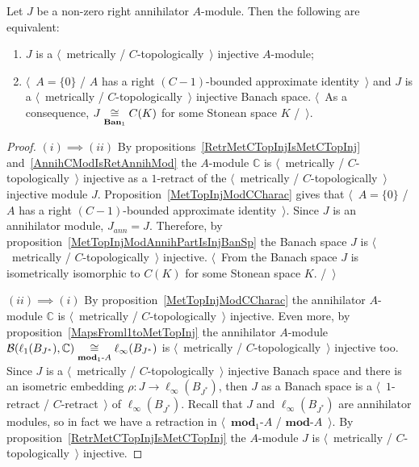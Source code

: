 \begin{proposition}\label{MetTopInjOfAnnihModCharac} Let $J$ be a non-zero right
annihilator $A$-module. Then the following are equivalent:

\begin{enumerate}[label = (\roman*)]
    \item $J$ is a $\langle$~metrically / $C$-topologically~$\rangle$ injective
    $A$-module;

    \item $\langle$~$A= \{0 \}$ / $A$ has a right $(C-1)$-bounded approximate
    identity~$\rangle$ and $J$ is a $\langle$~metrically /
    $C$-topologically~$\rangle$ injective Banach space. $\langle$~As a
    consequence, $J\mathrel{\mathop{\cong}\limits_{\mathbf{Ban}_1}}C(K)$ for some Stonean space $K$
    /~$\rangle$.
\end{enumerate}
\end{proposition}
\begin{proof} $(i)\implies (ii)$ By 
propositions~\ref{RetrMetCTopInjIsMetCTopInj} and~\ref{AnnihCModIsRetAnnihMod} 
the $A$-module $\mathbb{C}$ is
$\langle$~metrically / $C$-topologically~$\rangle$ injective as a $1$-retract of the
$\langle$~metrically / $C$-topologically~$\rangle$ injective module $J$.
Proposition~\ref{MetTopInjModCCharac} gives that $\langle$~$A= \{0 \}$ / $A$ has
a right $(C-1)$-bounded approximate identity~$\rangle$. Since $J$ is an
annihilator module, $J_{ann}=J$. Therefore, by
proposition~\ref{MetTopInjModAnnihPartIsInjBanSp} the Banach space $J$ is
$\langle$~metrically / $C$-topologically~$\rangle$ injective. $\langle$~From
\cite[theorem 3.11.6]{LaceyIsomThOfClassicBanSp} the Banach space $J$ is
isometrically isomorphic to $C(K)$ for some Stonean space $K$. /~$\rangle$

$(ii)\implies (i)$ By proposition~\ref{MetTopInjModCCharac} the annihilator
$A$-module $\mathbb{C}$ is $\langle$~metrically / $C$-topologically~$\rangle$
injective. Even more, by proposition~\ref{MapsFroml1toMetTopInj} 
the annihilator $A$-module
$\mathcal{B}(\ell_1(B_{J^*}),\mathbb{C})
\mathrel{\mathop{\cong}\limits_{\mathbf{mod}_1\text{-}A}}
\ell_\infty(B_{J^*})$ is $\langle$~metrically / $C$-topologically~$\rangle$ 
injective too. Since $J$ is a $\langle$~metrically / $C$-topologically~$\rangle$
injective Banach space and there is an isometric 
embedding $\rho:J\to \ell_\infty(B_{J^*})$, then $J$ as a
Banach space is a $\langle$~$1$-retract / $C$-retract~$\rangle$ of
$\ell_\infty(B_{J^*})$. Recall that $J$ and $\ell_\infty(B_{J^*})$ are
annihilator modules, so in fact we have a retraction in
$\langle$~$\mathbf{mod}_1\text{-}A$ / $\mathbf{mod}\text{-}A$~$\rangle$. By 
proposition~\ref{RetrMetCTopInjIsMetCTopInj} the $A$-module $J$ 
is $\langle$~metrically / $C$-topologically~$\rangle$ injective.
\end{proof}

